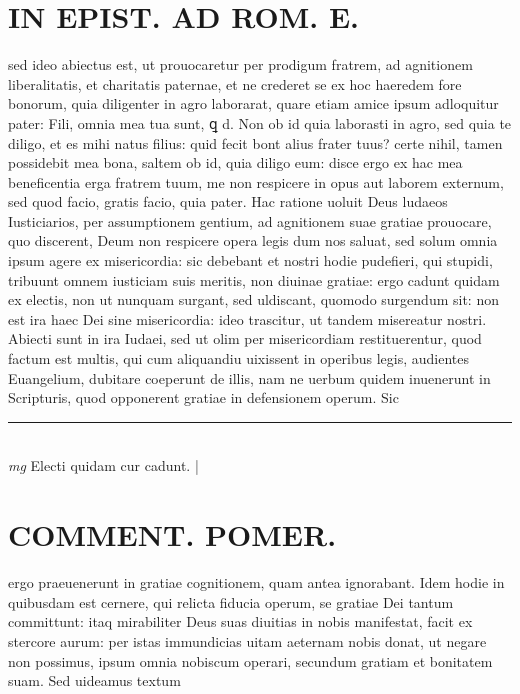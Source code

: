 \documentclass{article}
\begin{document}
\begin{pages}
\section*{IN EPIST. AD ROM.  E. }
\marginpar{[ p.]}\pstart sed ideo abiectus est, ut prouocaretur per prodigum fratrem, ad agnitionem liberalitatis, et charitatis paternae, et ne crederet se ex hoc haeredem fore bonorum, quia diligenter in agro laborarat, quare etiam amice ipsum adloquitur pater: Fili, omnia mea tua sunt, ꝗ d. Non ob id quia laborasti in agro, sed quia te diligo, et es mihi natus filius: quid fecit bont alius frater tuus? certe nihil, tamen possidebit mea bona, saltem ob id, quia diligo eum: disce ergo ex hac mea beneficentia erga fratrem tuum, me non respicere in opus aut laborem externum, sed quod facio, gratis facio, quia pater. Hac ratione uoluit Deus ludaeos Iusticiarios, per assumptionem gentium, ad agnitionem suae gratiae prouocare, quo discerent, Deum non respicere opera legis dum nos saluat, sed solum omnia ipsum agere ex misericordia: sic debebant et nostri hodie pudefieri, qui stupidi, tribuunt omnem iusticiam suis meritis, non diuinae gratiae: ergo cadunt quidam ex electis, non ut nunquam surgant, sed uldiscant, quomodo surgendum sit: non est ira haec Dei sine misericordia: ideo trascitur, ut tandem misereatur nostri. Abiecti sunt in ira Iudaei, sed ut olim per misericordiam restituerentur, quod factum est multis, qui cum aliquandiu uixissent in operibus legis, audientes Euangelium, dubitare coeperunt de illis, nam ne uerbum quidem inuenerunt in Scripturis, quod opponerent gratiae in defensionem operum. Sic  \pend
\vspace{0.5cm}\noindent
\vspace{0.2cm}\rule{1cm}{0.2pt}\\ 
\hspace{0.2cm}\textit{mg}
\footnotesize Electi quidam cur cadunt.  
\normalsize| 
\section*{COMMENT. POMER.  }\pstart ergo praeuenerunt in gratiae cognitionem, quam antea ignorabant. Idem hodie in quibusdam est cernere, qui relicta fiducia operum, se gratiae Dei tantum committunt: itaq mirabiliter Deus suas diuitias in nobis manifestat, facit ex stercore aurum: per istas immundicias uitam aeternam nobis donat, ut negare non possimus, ipsum omnia nobiscum operari, secundum gratiam et bonitatem suam. Sed uideamus textum  \pend
{}
{}

\end{pages}
\end{document}
